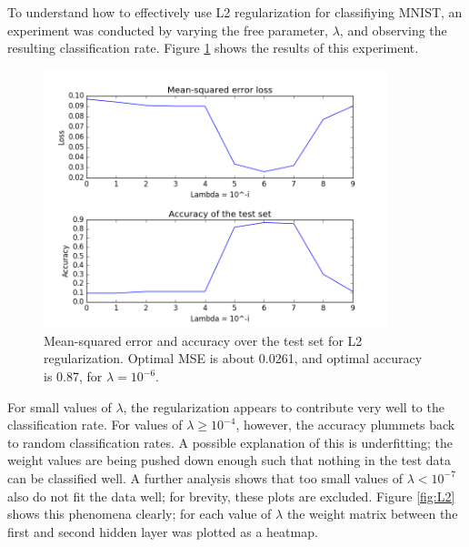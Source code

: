 \documentclass{article}
\begin{document}
To understand how to effectively use L2 regularization for classifiying MNIST, an experiment was conducted by varying the free parameter, $\lambda$, and observing the resulting classification rate. Figure \ref{fig:mse2} shows the results of this experiment. \\


\begin{figure}[H]
    \centering
    \includegraphics[width=10cm]{mse.png}
    \caption{Mean-squared error and accuracy over the test set for L2 regularization. Optimal MSE is about 0.0261, and optimal accuracy is 0.87, for $\lambda = 10^{-6}$.}
    \label{fig:mse2}
\end{figure}

For small values of $\lambda$, the regularization appears to contribute very well to the classification rate. For values of $\lambda \geq 10^{-4}$, however, the accuracy plummets back to random classification rates. A possible explanation of this is underfitting; the weight values are being pushed down enough such that nothing in the test data can be classified well. A further analysis shows that too small values of $\lambda < 10^{-7}$ also do not fit the data well; for brevity, these plots are excluded. Figure \ref{fig:L2} shows this phenomena clearly; for each value of $\lambda$ the weight matrix between the first and second hidden layer was plotted as a heatmap. 
\end{document}
